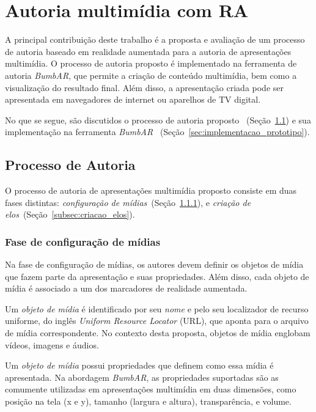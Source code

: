 \documentclass[../main.tex]{subfiles}
\begin{document}
\chapter{Autoria multimídia com RA}\label{cap:proposta}

A principal contribuição deste trabalho é a proposta e avaliação de um processo de autoria baseado em realidade aumentada para a autoria de apresentações multimídia. O processo de autoria proposto é implementado na ferramenta de autoria \emph{BumbAR}, que permite a criação de conteúdo multimídia, bem como a visualização do resultado final. Além disso, a apresentação criada pode ser apresentada em navegadores de internet ou aparelhos de TV digital.

No que se segue, são discutidos o processo de autoria proposto ~(Seção~\ref{sec:processo_autoria}) e sua implementação na ferramenta \emph{BumbAR} ~(Seção~\ref{sec:implementacao_prototipo}).

\section{Processo de Autoria}
\label{sec:processo_autoria}

O processo de autoria de apresentações multimídia proposto consiste em duas fases distintas: \emph{configuração de mídias}~(Seção~\ref{subsec:midias_configuracao}), e \emph{criação de elos}~(Seção~\ref{subsec:criacao_elos}).

\subsection{Fase de configuração de mídias}
\label{subsec:midias_configuracao}

Na fase de configuração de mídias, os autores devem definir os objetos de mídia que fazem parte da apresentação e suas propriedades. Além disso, cada objeto de mídia é associado a um dos marcadores de realidade aumentada.

Um \emph{objeto de mídia} é identificado por seu \emph{nome} e pelo seu localizador de recurso uniforme, do inglês \emph{Uniform Resource Locator} (URL), que aponta para o arquivo de mídia correspondente. No contexto desta proposta, objetos de mídia englobam vídeos, imagens e áudios.

Um \emph{objeto de mídia} possui propriedades que definem como essa mídia é apresentada. Na abordagem \emph{BumbAR}, as propriedades suportadas são as comumente utilizadas em apresentações multimídia em duas dimensões, como posição na tela (x e y), tamanho (largura e altura), transparência, e volume.
\end{document}
